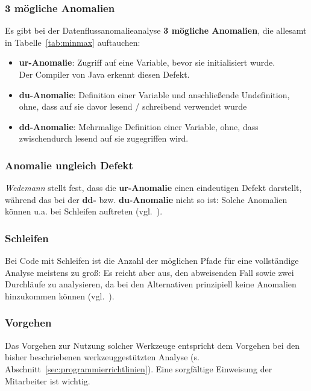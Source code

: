 \subsubsection*{3 mögliche Anomalien}
Es gibt bei der Datenflussanomalieanalyse \textbf{3 mögliche Anomalien}, die allesamt in Tabelle~\ref{tab:minmax} auftauchen:

\begin{itemize}
    \item \textbf{ur-Anomalie}: Zugriff auf eine Variable, bevor sie initialisiert wurde.\\
    Der Compiler von Java erkennt diesen Defekt.
    \item \textbf{du-Anomalie}: Definition einer Variable und anschließende Undefinition, ohne, dass auf sie davor lesend / schreibend verwendet wurde
    \item \textbf{dd-Anomalie}: Mehrmalige Definition einer Variable, ohne, dass zwischendurch lesend auf sie zugegriffen wird.
\end{itemize}

\subsubsection*{Anomalie ungleich Defekt}
\textit{Wedemann} stellt fest, dass die \textbf{ur-Anomalie} einen eindeutigen Defekt darstellt, während das bei der \textbf{dd-} bzw. \textbf{du-Anomalie} nicht so ist: Solche Anomalien können u.a. bei Schleifen auftreten (vgl.~\cite[35]{Wed09c}).

\subsubsection*{Schleifen}
Bei Code mit Schleifen ist die Anzahl der möglichen Pfade für eine vollständige Analyse meistens zu groß: Es reicht aber aus, den abweisenden Fall sowie zwei Durchläufe zu analysieren, da bei den Alternativen prinzipiell keine Anomalien hinzukommen können (vgl.~\cite[35]{Wed09c}).

\subsubsection*{Vorgehen}
Das Vorgehen zur Nutzung solcher Werkzeuge entspricht dem Vorgehen bei den bisher beschriebenen werkzeuggestützten Analyse (s. Abschnitt~\ref{sec:programmierrichtlinien}).
Eine sorgfältige Einweisung der Mitarbeiter ist wichtig.

